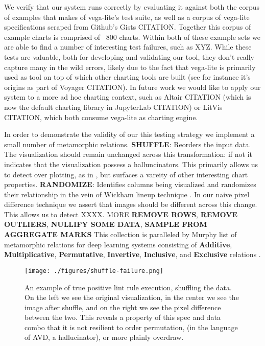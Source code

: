 We verify that our system runs correctly by evaluating it against both the corpus of examples that makes of vega-lite's test suite, as well as a corpus of vega-lite specifications scraped from Github's Gists CITATION. Together this corpus of example charts is comprised of ~800 charts. Within both of these example sets we are able to find a number of interesting test failures, such as XYZ. While these tests are valuable, both for developing and validating our tool, they don't really capture many in the wild errors, likely due to the fact that vega-lite is primarily used as tool on top of which other charting tools are built (see for instance it's origins as part of Voyager CITATION). In future work we would like to apply our system to a more ad hoc charting context, such as Altair CITATION (which is now the default charting library in JupyterLab CITATION) or LitVis CITATION, which both consume vega-lite as charting engine.

In order to demonstrate the validity of our this testing strategy we implement a small number of metamorphic relations. \textbf{SHUFFLE}: Reorders the input data. The visualization should remain unchanged across this transformation: if not it indicates that the visualization possess a halluncinators. This primarily allows us to detect over plotting, as in , but surfaces a vareity of other interesting chart properties. \textbf{RANDOMIZE}: Identifies columns being visualized and randomizes their relationship in the vein of Wickham \etals lineup technique \cite{wickham2010graphical}. In our naive pixel difference technique we assert that images should be different across this change. This allows us to detect XXXX. MORE \textbf{REMOVE ROWS}, \textbf{REMOVE OUTLIERS}, \textbf{NULLIFY SOME DATA}, \textbf{SAMPLE FROM AGGREGATE MARKS} This collection is paralleled by Murphy \etals list of metamorphic relations for deep learning systems consisting of \textbf{Additive}, \textbf{Multiplicative}, \textbf{Permutative}, \textbf{Invertive}, \textbf{Inclusive}, and \textbf{Exclusive} relations \cite{murphy2008properties}.



\begin{figure}[bth]
   \centering
   \texttt{[image: ./figures/shuffle-failure.png]}
   \caption{
    An example of true positive lint rule execution, shuffling the data. On the left we see the original visualization, in the center we see the image after shuffle, and on the right we see the pixel difference between the two. This reveals a property of this spec and data combo that it is not resilient to order permutation, (in the language of AVD, a hallucinator), or more plainly overdraw.
   }
   \label{fig:shuffle-lint}
\end{figure}
